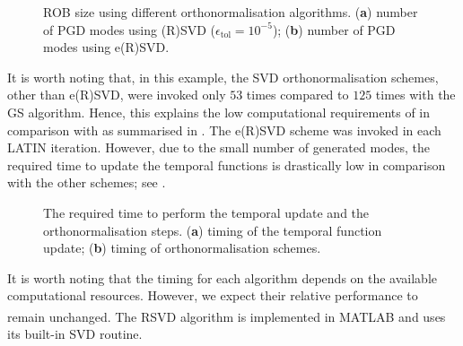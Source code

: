 \begin{figure}[hbt!]
	\centering
	\begin{subfigure}[t]{0.49\linewidth}
		
		\caption{}
	\end{subfigure}
	\hfil
	\begin{subfigure}[t]{0.49\linewidth}
		
		\caption{}
	\end{subfigure}
	\caption{ROB size using different orthonormalisation algorithms. (\textbf{a}) number of PGD modes using (R)SVD ($\epsilon_{\mathrm{tol}}=10^{-5}$); (\textbf{b}) number of PGD modes using e(R)SVD.}
	\label{fig_100cycles_number_of_modes_2}
\end{figure}

It is worth noting that, in this example, the SVD orthonormalisation schemes, other than e(R)SVD, were invoked only $53$ times compared to $125$ times with the GS algorithm. Hence, this explains the low computational requirements of  in comparison with  as summarised in . The e(R)SVD scheme was invoked in each LATIN iteration. However, due to the small number of generated modes, the required time to update the temporal functions is drastically low in comparison with the other schemes; see .

\begin{figure}[hbt!]
	\centering
	\begin{subfigure}[t]{0.49\linewidth}
		
		\caption{}
		\label{fig_update_cost}
	\end{subfigure}
	\hfil
	\begin{subfigure}[t]{0.49\linewidth}
		
		\caption{}
		\label{fig_orthonormalisation_cost}
	\end{subfigure}
	\caption{The required time to perform the temporal update and the orthonormalisation steps. (\textbf{a}) timing of the temporal function update; (\textbf{b}) timing of orthonormalisation schemes.}
	\label{fig_numerical_cost_update}
\end{figure}

It is worth noting that the timing for each algorithm depends on the available computational resources. However, we expect their relative performance to remain unchanged. The RSVD algorithm is implemented in MATLAB\textsuperscript{\textregistered} and uses its built-in SVD routine.

